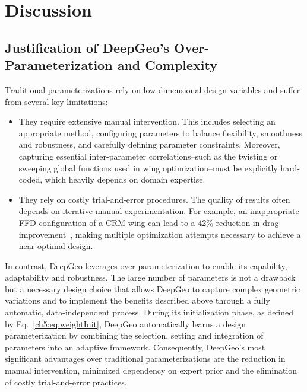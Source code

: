 \section{Discussion}

\subsection{Justification of DeepGeo's Over-Parameterization and Complexity}
\label{ch5:sec:complexity}

Traditional parameterizations rely on low-dimensional design variables and suffer from several key limitations:
\begin{itemize}
    \item They require extensive manual intervention. This includes selecting an appropriate method, configuring parameters to balance flexibility, smoothness and robustness, and carefully defining parameter constraints. Moreover, capturing essential inter-parameter correlations--such as the twisting or sweeping global functions used in wing optimization--must be explicitly hard-coded, which heavily depends on domain expertise.

    \item They rely on costly trial-and-error procedures. The quality of results often depends on iterative manual experimentation. For example, an inappropriate FFD configuration of a CRM wing can lead to a 42\% reduction in drag improvement~\cite{aa.Lyu2015}, making multiple optimization attempts necessary to achieve a near-optimal design.
\end{itemize}

In contrast, DeepGeo leverages over-parameterization to enable its capability, adaptability and robustness. The large number of parameters is not a drawback but a necessary design choice that allows DeepGeo to capture complex geometric variations and to implement the benefits described above through a fully automatic, data-independent process. During its initialization phase, as defined by Eq.~\ref{ch5:eq:weightInit}, DeepGeo automatically learns a design parameterization by combining the selection, setting and integration of parameters into an adaptive framework. Consequently, DeepGeo’s most significant advantages over traditional parameterizations are the reduction in manual intervention, minimized dependency on expert prior and the elimination of costly trial-and-error practices.



